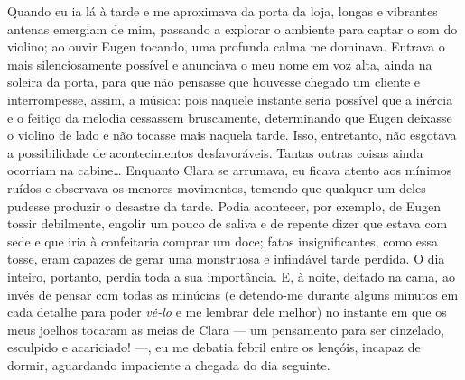 
Quando eu ia lá à tarde e me aproximava da porta da loja, longas e vibrantes
antenas emergiam de mim, passando a explorar o ambiente para captar o som do
violino; ao ouvir Eugen tocando, uma profunda calma me dominava. Entrava o
mais silenciosamente possível e anunciava o meu nome em voz alta, ainda na
soleira da porta, para que não pensasse que houvesse chegado um cliente e
interrompesse, assim, a música: pois naquele instante seria possível que a
inércia e o feitiço da melodia cessassem bruscamente, determinando que Eugen
deixasse o violino de lado e não tocasse mais naquela tarde. Isso,
entretanto, não esgotava a possibilidade de acontecimentos desfavoráveis.
Tantas outras coisas ainda ocorriam na cabine\ldots{} Enquanto Clara se
arrumava, eu ficava atento aos mínimos ruídos e observava os menores
movimentos, temendo que qualquer um deles pudesse produzir o desastre da
tarde. Podia acontecer, por exemplo, de Eugen tossir debilmente, engolir um
pouco de saliva e de repente dizer que estava com sede e que iria à
confeitaria comprar um doce; fatos insignificantes, como essa tosse, eram
capazes de gerar uma monstruosa e infindável tarde perdida. O dia inteiro,
portanto, perdia toda a sua importância. E, à noite, deitado na cama, ao
invés de pensar com todas as minúcias (e detendo-me durante alguns minutos em
cada detalhe para poder \textit{vê-lo} e me lembrar dele melhor) no instante
em que os meus joelhos tocaram as meias de Clara --- um pensamento para ser
cinzelado, esculpido e acariciado! ---, eu me debatia febril entre os
lençóis, incapaz de dormir, aguardando impaciente a chegada do dia seguinte.


